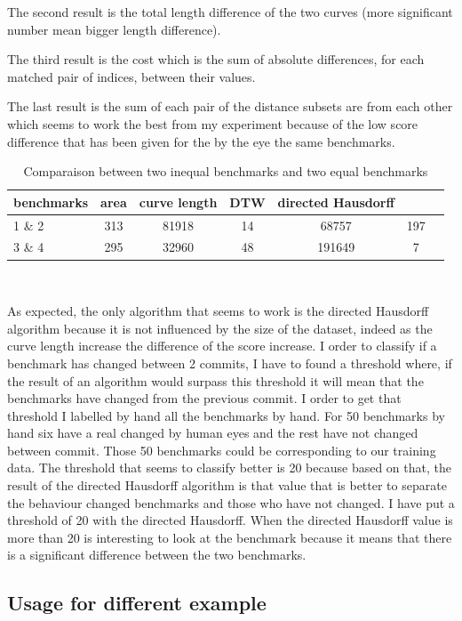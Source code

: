 \documentclass{article}
\begin{document}
The second result is the total length difference of the two curves (more significant number mean bigger length difference).

The third result is the cost which is the sum of absolute differences, for each matched pair of indices, between their values.

The last result is the sum of each pair of the distance subsets are from each other which seems to work the best from my experiment because of the low score difference that has been given for the by the eye the same benchmarks.

\begin{table}[h!]
\begin{tabular}{|l|c|c|c|c|c|c|}
   \hline
   benchmarks  & area & curve length & DTW & directed Hausdorff \\
   \hline
   1 \&  2 & 313 & 81918 & 14 & 68757 & 197\\
   \hline
   3 \& 4  & 295 & 32960 & 48 & 191649 & 7 \\
   \hline
\end{tabular} \\ 
\caption{Comparaison between two inequal benchmarks and two equal benchmarks}
\label{result}
\end{table}


As expected, the only algorithm that seems to work is the directed Hausdorff algorithm because it is not influenced by the size of the dataset, indeed as the curve length increase the difference of the score increase. 
I order to classify if a benchmark has changed between 2 commits, I have to found a threshold where, if the result of an algorithm would surpass this threshold it will mean that the benchmarks have changed from the previous commit. I order to get that threshold I labelled by hand all the benchmarks by hand. For 50 benchmarks by hand six have a real changed by human eyes and the rest have not changed between commit. Those 50 benchmarks could be corresponding to our training data. The threshold that seems to classify better is 20 because based on that, the result of the directed Hausdorff algorithm is that value that is better to separate the behaviour changed benchmarks and those who have not changed.
I have put a threshold of 20 with the directed Hausdorff. When the directed Hausdorff value is more than 20 is interesting to look at the benchmark because it means that there is a significant difference between the two benchmarks.


\subsection{Usage for different example}
\end{document}
